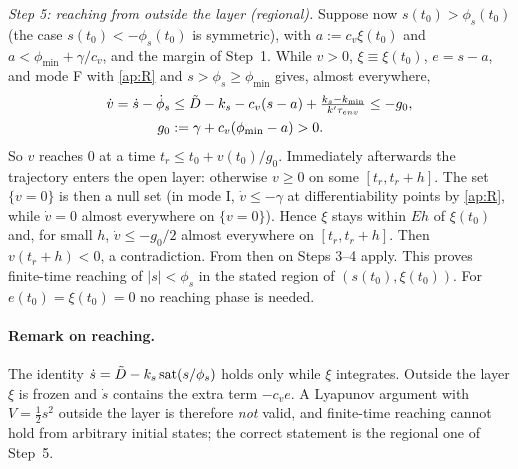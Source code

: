 \emph{Step 5: reaching from outside the layer (regional).} Suppose now $s(t_0)>\phi_s(t_0)$ (the case $s(t_0)<-\phi_s(t_0)$ is symmetric), with $a:=c_v\xi(t_0)$ and $a<\phi_{\min}+\gamma/c_v$, and the margin of Step~1. While $v>0$, $\xi\equiv\xi(t_0)$, $e=s-a$, and mode F with \eqref{ap:R} and $s>\phi_s\ge\phi_{\min}$ gives, almost everywhere,
\begin{align*}
\dot v=\dot s-\dot\phi_s&\le\tilde{D}-k_s-c_v(s-a)+\tfrac{k_s-k_{\min}}{k'\tau_{env}}\le-g_0,\\
g_0&:=\gamma+c_v(\phi_{\min}-a)>0.
\end{align*}
So $v$ reaches $0$ at a time $t_r\le t_0+v(t_0)/g_0$. Immediately afterwards the trajectory enters the open layer: otherwise $v\ge0$ on some $[t_r,t_r+h]$. The set $\{v=0\}$ is then a null set (in mode I, $\dot v\le-\gamma$ at differentiability points by \eqref{ap:R}, while $\dot v=0$ almost everywhere on $\{v=0\}$). Hence $\xi$ stays within $E h$ of $\xi(t_0)$ and, for small $h$, $\dot v\le-g_0/2$ almost everywhere on $[t_r,t_r+h]$. Then $v(t_r+h)<0$, a contradiction. From then on Steps 3--4 apply. This proves finite-time reaching of $|s|<\phi_s$ in the stated region of $(s(t_0),\xi(t_0))$. For $e(t_0)=\xi(t_0)=0$ no reaching phase is needed.

\paragraph{Remark on reaching.} The identity $\dot s=\tilde{D}-k_s\,\mathrm{sat}(s/\phi_s)$ holds only while $\xi$ integrates. Outside the layer $\xi$ is frozen and $\dot s$ contains the extra term $-c_ve$. A Lyapunov argument with $V=\tfrac12s^2$ outside the layer is therefore \emph{not} valid, and finite-time reaching cannot hold from arbitrary initial states; the correct statement is the regional one of Step~5.

